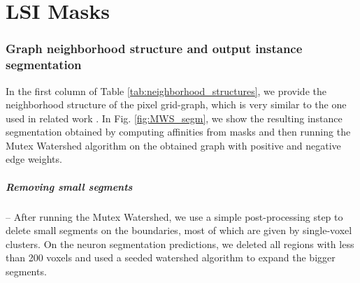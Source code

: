 
\chapter{LSI Masks}




\subsection{Graph neighborhood structure and output instance segmentation}
In the first column of Table \ref{tab:neighborhood_structures}, we provide the neighborhood structure of the pixel grid-graph, which is very similar to the one used in related work \cite{wolf2018mutex,lee2017superhuman}.
In Fig. \ref{fig:MWS_segm}, we show the resulting instance segmentation obtained by computing affinities from \maskname masks and then running the Mutex Watershed algorithm on the obtained graph with positive and negative edge weights.

\paragraph{Removing small segments} -- After running the Mutex Watershed, we use a simple post-processing step to delete small segments on the boundaries, most of which are given by single-voxel clusters. On the neuron segmentation predictions, we deleted all regions with less than 200 voxels and used a seeded watershed algorithm to expand the bigger segments.


